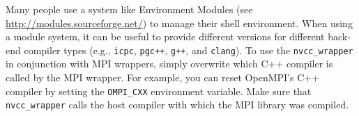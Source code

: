 Many people use a system like Environment Modules (see \\ \url{http://modules.sourceforge.net/}) to manage their shell environment.
When using a module system, it can be useful to provide different versions for different back-end compiler types (e.g., \verb!icpc!, \verb!pgc++!, \verb!g++!, and \verb!clang!).
To use the \lstinline|nvcc_wrapper| in conjunction with MPI wrappers, simply overwrite which C++ compiler is called by the MPI wrapper. 
For example, you can reset OpenMPI's C++ compiler by setting the \lstinline|OMPI_CXX| environment variable.
Make sure that \lstinline|nvcc_wrapper| calls the host compiler with which the MPI library was compiled.

